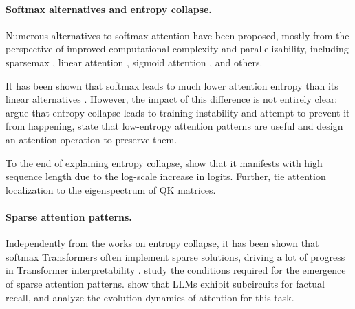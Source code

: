 \documentclass{article}
\theoremstyle{plain}
\theoremstyle{definition}
\theoremstyle{remark}
\begin{document}
\paragraph{Softmax alternatives and entropy collapse.}

Numerous alternatives to softmax attention have been proposed, mostly from the perspective of improved computational complexity and parallelizability, including sparsemax \citep{martins2016softmax}, linear attention \citep{pmlr-v119-katharopoulos20a, qin2022cosformer, wortsman2023replacing}, sigmoid attention \citep{ramapuram2025theory}, and others.

It has been shown that softmax leads to much lower attention entropy than its linear alternatives \citep{hong-lee-2025-variance}. However, the impact of this difference is not entirely clear: \citet{stabilizing-transformer-training} argue that entropy collapse leads to training instability and attempt to prevent it from happening, \citet{zhang2024hedgehog} state that low-entropy attention patterns are useful and design an attention operation to preserve them.

To the end of explaining entropy collapse, \citet{deng2024sparse} show that it manifests with high sequence length due to the log-scale increase in logits. Further, \citet{bao2024self} tie attention localization to the eigenspectrum of QK matrices. 

\paragraph{Sparse attention patterns.} Independently from the works on entropy collapse, it has been shown that softmax Transformers often implement sparse solutions, driving a lot of progress in Transformer interpretability \citep{olsson2022context, lindsey2025biology}. \citet{singh2024needs, zucchet2025emergence, yuksel2025incremental, varre2025learning} study the conditions required for the emergence of sparse attention patterns. 
\citet{nanda2023factfinding} show that LLMs exhibit subcircuits for factual recall, and
\citet{zucchet2025language} analyze the evolution dynamics of attention for this task.
\end{document}
